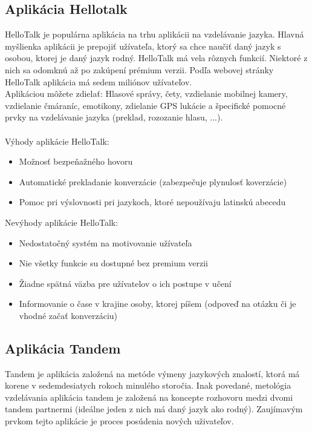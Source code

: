 \documentclass[10pt,oneside,slovak,a4paper]{article}
\begin{document}
\subsection{Aplikácia Hellotalk} %
HelloTalk je populárna aplikácia na trhu aplikácii na vzdelávanie jazyka. Hlavná myšlienka aplikácii je prepojiť užívateľa, ktorý sa chce naučiť daný jazyk s osobou, ktorej je daný jazyk rodný. HelloTalk má vela rôznych funkcií. Niektoré z nich sa odomknú až po zakúpení prémium verzii. Podľa webovej stránky HelloTalk aplikácia má sedem miliónov užívateľov.\cite{hellotalk}\\
Aplikáciou môžete zdielať: Hlasové správy, čety,  vzdielanie mobilnej kamery, vzdielanie čmáraníc, emotikony, zdielanie GPS lukácie a špecifické pomocné prvky na vzdelávanie jazyka (preklad, rozozanie hlasu, ...)\cite{hellotalk}.\\
\\
Výhody aplikácie HelloTalk:\cite{hellotalk}
\begin{itemize}
\item Možnosť bezpeňažného hovoru
\item Automatické prekladanie konverzácie (zabezpečuje plynulosť koverzácie)
\item Pomoc pri výslovnosti pri jazykoch, ktoré nepoužívaju latinskú abecedu
\end{itemize}
Nevýhody aplikácie HelloTalk:\cite{hellotalk}
\begin{itemize}
\item Nedostatočný systém na motivovanie užívateľa
\item Nie všetky funkcie su dostupné bez premium verzii
\item Žiadne spätná väzba pre užívatelov o ich postupe v učení 
\item Informovanie o čase v krajine osoby, ktorej píšem (odpoveď na otázku či je vhodné začať konverzáciu)
\end{itemize}

\subsection{Aplikácia Tandem} %
Tandem je aplikácia založená na metóde výmeny jazykových znalostí, ktorá má korene v sedemdesiatych rokoch minulého storočia. Inak povedané, metológia vzdelávania aplikácia tandem je založená na koncepte rozhovoru medzi dvomi tandem partnermi (ideálne jeden z nich má daný jazyk ako rodný).
Zaujímavým prvkom tejto aplikácie je proces posúdenia nových uživateľov.\cite{tandem}
\end{document}
